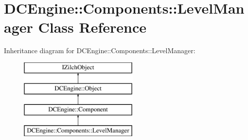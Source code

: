 \hypertarget{classDCEngine_1_1Components_1_1LevelManager}{\section{D\-C\-Engine\-:\-:Components\-:\-:Level\-Manager Class Reference}
\label{classDCEngine_1_1Components_1_1LevelManager}
}
Inheritance diagram for D\-C\-Engine\-:\-:Components\-:\-:Level\-Manager\-:\begin{figure}[H]
\begin{center}
\leavevmode
\includegraphics[height=4.000000cm]{classDCEngine_1_1Components_1_1LevelManager}
\end{center}
\end{figure}
